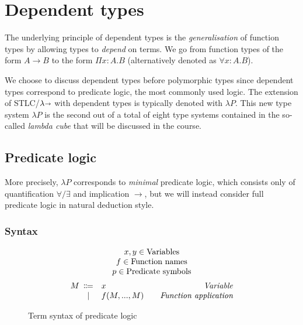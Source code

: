 \section{Dependent types}

The underlying principle of dependent types is the \emph{generalisation} of function types
by allowing types to \emph{depend} on terms.
We go from function types of the form $A \to B$ to the form $\Pi x : A. B$
(alternatively denoted as $\forall x : A. B$).

We choose to discuss dependent types before polymorphic types since dependent types correspond to
predicate logic, the most commonly used logic.
The extension of STLC/$\lambda\kern -.25em \shortrightarrow$ with dependent types is typically denoted with $\lambda P$.
This new type system $\lambda P$ is the second out of a total of eight type systems contained in
the so-called \emph{lambda cube} that will be discussed in the course.

\subsection{Predicate logic}
More precisely, $\lambda P$ corresponds to \emph{minimal} predicate logic, which consists only
of quantification $\forall/\exists$ and implication $\to$,
but we will instead consider full predicate logic in natural deduction style.

\subsubsection{Syntax}

\begin{figure}[htbp]
    \[
    \begin{array}{r@{\hspace{.5em}}cl@{\hspace{2em}}r}
        \multicolumn{4}{c}{x,y \in \text{Variables}}\\
        \multicolumn{4}{c}{f \in \text{Function names}}\\
        \multicolumn{4}{c}{p \in \text{Predicate symbols}}\\[2mm]
        M & \Coloneqq & x & \emph{Variable} \\
        & | & f(M,...,M) & \emph{Function application}
    \end{array}
    \]
    \caption{Term syntax of predicate logic}
    \label{fig:predicate-logic-term-syntax}
\end{figure}

